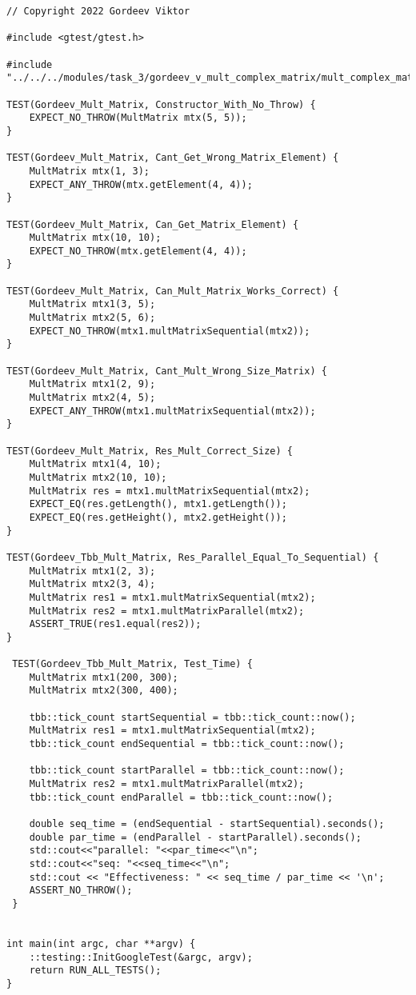 \documentclass{report}
\begin{document}
\begin{lstlisting}
// Copyright 2022 Gordeev Viktor

#include <gtest/gtest.h>

#include "../../../modules/task_3/gordeev_v_mult_complex_matrix/mult_complex_matrix.h"

TEST(Gordeev_Mult_Matrix, Constructor_With_No_Throw) {
    EXPECT_NO_THROW(MultMatrix mtx(5, 5));
}

TEST(Gordeev_Mult_Matrix, Cant_Get_Wrong_Matrix_Element) {
    MultMatrix mtx(1, 3);
    EXPECT_ANY_THROW(mtx.getElement(4, 4));
}

TEST(Gordeev_Mult_Matrix, Can_Get_Matrix_Element) {
    MultMatrix mtx(10, 10);
    EXPECT_NO_THROW(mtx.getElement(4, 4));
}

TEST(Gordeev_Mult_Matrix, Can_Mult_Matrix_Works_Correct) {
    MultMatrix mtx1(3, 5);
    MultMatrix mtx2(5, 6);
    EXPECT_NO_THROW(mtx1.multMatrixSequential(mtx2));
}

TEST(Gordeev_Mult_Matrix, Cant_Mult_Wrong_Size_Matrix) {
    MultMatrix mtx1(2, 9);
    MultMatrix mtx2(4, 5);
    EXPECT_ANY_THROW(mtx1.multMatrixSequential(mtx2));
}

TEST(Gordeev_Mult_Matrix, Res_Mult_Correct_Size) {
    MultMatrix mtx1(4, 10);
    MultMatrix mtx2(10, 10);
    MultMatrix res = mtx1.multMatrixSequential(mtx2);
    EXPECT_EQ(res.getLength(), mtx1.getLength());
    EXPECT_EQ(res.getHeight(), mtx2.getHeight());
}

TEST(Gordeev_Tbb_Mult_Matrix, Res_Parallel_Equal_To_Sequential) {
    MultMatrix mtx1(2, 3);
    MultMatrix mtx2(3, 4);
    MultMatrix res1 = mtx1.multMatrixSequential(mtx2);
    MultMatrix res2 = mtx1.multMatrixParallel(mtx2);
    ASSERT_TRUE(res1.equal(res2));
}

 TEST(Gordeev_Tbb_Mult_Matrix, Test_Time) {
    MultMatrix mtx1(200, 300);
    MultMatrix mtx2(300, 400);

    tbb::tick_count startSequential = tbb::tick_count::now();
    MultMatrix res1 = mtx1.multMatrixSequential(mtx2);
    tbb::tick_count endSequential = tbb::tick_count::now();

    tbb::tick_count startParallel = tbb::tick_count::now();
    MultMatrix res2 = mtx1.multMatrixParallel(mtx2);
    tbb::tick_count endParallel = tbb::tick_count::now();

    double seq_time = (endSequential - startSequential).seconds();
    double par_time = (endParallel - startParallel).seconds();
    std::cout<<"parallel: "<<par_time<<"\n";
    std::cout<<"seq: "<<seq_time<<"\n";
    std::cout << "Effectiveness: " << seq_time / par_time << '\n';
    ASSERT_NO_THROW();
 }


int main(int argc, char **argv) {
    ::testing::InitGoogleTest(&argc, argv);
    return RUN_ALL_TESTS();
}

\end{lstlisting}
\end{document}
